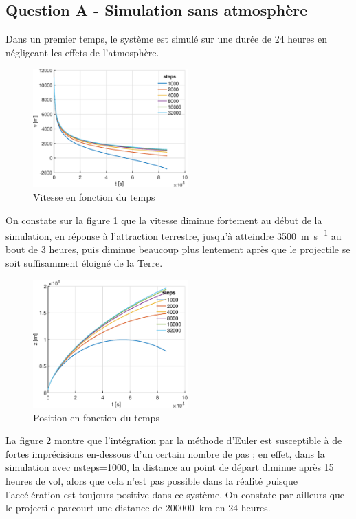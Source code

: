 \documentclass[a4paper,12pt,twoside]{article}
\begin{document}
\subsection{Question A - Simulation sans atmosphère}
Dans un premier temps, le système est simulé sur une durée de 24 heures en négligeant les effets de l'atmosphère.

\begin{figure}[h]
	\centering
    \includegraphics[width=0.53\textwidth]{graphs/vA.eps}
    \caption{Vitesse en fonction du temps}
    \label{fig:A-vt}
\end{figure}

On constate sur la figure \ref{fig:A-vt} que la vitesse diminue fortement au début de la simulation, en réponse à l'attraction terrestre, jusqu'à atteindre \SI{3500}{\meter\per\second} au bout de 3 heures, puis diminue beaucoup plus lentement après que le projectile se soit suffisamment éloigné de la Terre.\\

\begin{figure}[h]
	\centering
	\includegraphics[width=0.53\textwidth]{graphs/zA.eps}
	\caption{Position en fonction du temps}
	\label{fig:A-zt}
\end{figure}

La figure \ref{fig:A-zt} montre que l'intégration par la méthode d'Euler est susceptible à de fortes imprécisions en-dessous d'un certain nombre de pas ;
en effet, dans la simulation avec nsteps=1000, la distance au point de départ diminue après 15 heures de vol, alors que cela n'est pas possible dans la réalité puisque l'accélération est toujours positive dans ce système.
On constate par ailleurs que le projectile parcourt une distance de \SI{200000}{\kilo\meter} en 24 heures.\\
\end{document}
